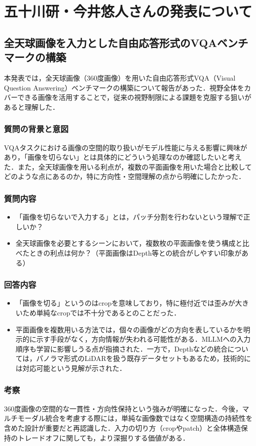 \section{五十川研・今井悠人さんの発表について}

\subsection{全天球画像を入力とした自由応答形式のVQAベンチマークの構築}
本発表では，全天球画像（360度画像）を用いた自由応答形式VQA（Visual Question Answering）ベンチマークの構築について報告があった．視野全体をカバーできる画像を活用することで，従来の視野制限による課題を克服する狙いがあると理解した．

\subsubsection{質問の背景と意図}
VQAタスクにおける画像の空間的取り扱いがモデル性能に与える影響に興味があり，「画像を切らない」とは具体的にどういう処理なのか確認したいと考えた．また，全天球画像を用いる利点が，複数の平面画像を用いた場合と比較してどのような点にあるのか，特に方向性・空間理解の点から明確にしたかった．

\subsubsection{質問内容}
\begin{itemize}
	\item 「画像を切らないで入力する」とは，パッチ分割を行わないという理解で正しいか？
	\item 全天球画像を必要とするシーンにおいて，複数枚の平面画像を使う構成と比べたときの利点は何か？（平面画像はDepth等との統合がしやすい印象がある）
\end{itemize}

\subsubsection{回答内容}
\begin{itemize}
	\item 「画像を切る」というのはcropを意味しており，特に極付近では歪みが大きいため単純なcropでは不十分であるとのことだった．
	\item 平面画像を複数用いる方法では，個々の画像がどの方向を表しているかを明示的に示す手段がなく，方向情報が失われる可能性がある．MLLMへの入力順序も学習に影響しうる点が指摘された．一方で，Depthなどの統合については，パノラマ形式のLiDARを扱う既存データセットもあるため，技術的には対応可能という見解が示された．
\end{itemize}

\subsubsection{考察}
360度画像の空間的な一貫性・方向性保持という強みが明確になった．今後，マルチモーダル統合を考慮する際には，単純な画像数ではなく空間構造の持続性を含めた設計が重要だと再認識した．入力の切り方（cropやpatch）と全体構造保持のトレードオフに関しても，より深掘りする価値がある．